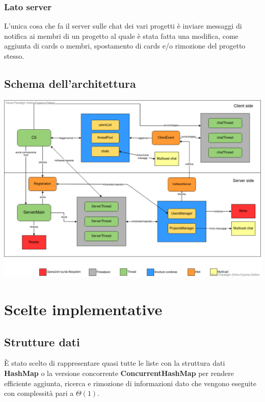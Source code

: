 \documentclass[11pt]{report}
\begin{document}
	\subsection{Lato server}
	L'unica cosa che fa il server sulle chat dei vari progetti è inviare messaggi di notifica ai membri di un progetto al quale è stata fatta una modifica, come aggiunta di cards o membri, spostamento di cards e/o rimozione del progetto stesso.
	
	\section{Schema dell'architettura}
	\begin{center}
		\includegraphics[width=1\textwidth]{project-architecture}
	\end{center}
	
	\chapter{Scelte implementative}
	\section{Strutture dati}
	È stato scelto di rappresentare quasi tutte le liste con la struttura dati \textbf{HashMap} o la versione concorrente \textbf{ConcurrentHashMap} per rendere efficiente aggiunta, ricerca e rimozione di informazioni dato che vengono eseguite con complessità pari a $\Theta(1)$.\\
	
\end{document}
